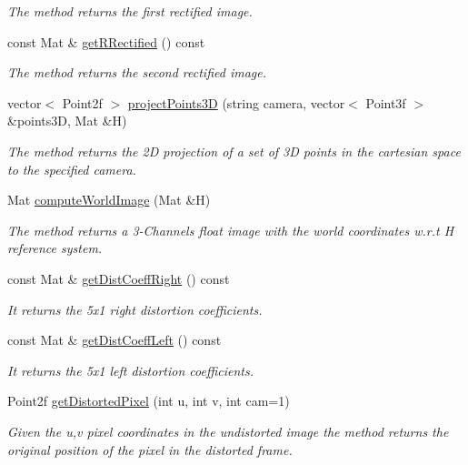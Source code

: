 \begin{DoxyCompactItemize}
\begin{DoxyCompactList}\small\item\em The method returns the first rectified image. \end{DoxyCompactList}\item 
const Mat \& \hyperlink{classStereoCamera_abe2388276233331d360a73d86080c981}{get\+R\+Rectified} () const 
\begin{DoxyCompactList}\small\item\em The method returns the second rectified image. \end{DoxyCompactList}\item 
vector$<$ Point2f $>$ \hyperlink{classStereoCamera_a03406c9d31c1b765a8d6ef9641222309}{project\+Points3D} (string camera, vector$<$ Point3f $>$ \&points3D, Mat \&H)
\begin{DoxyCompactList}\small\item\em The method returns the 2D projection of a set of 3D points in the cartesian space to the specified camera. \end{DoxyCompactList}\item 
Mat \hyperlink{classStereoCamera_a52ef2f3401488e5c4fa6badd1336f96d}{compute\+World\+Image} (Mat \&H)
\begin{DoxyCompactList}\small\item\em The method returns a 3-\/\+Channels float image with the world coordinates w.\+r.\+t H reference system. \end{DoxyCompactList}\item 
const Mat \& \hyperlink{classStereoCamera_a58f7ef25aa322cb40b2609758ff4768b}{get\+Dist\+Coeff\+Right} () const 
\begin{DoxyCompactList}\small\item\em It returns the 5x1 right distortion coefficients. \end{DoxyCompactList}\item 
const Mat \& \hyperlink{classStereoCamera_a3dbf51487738aabcb60595c53fb1660d}{get\+Dist\+Coeff\+Left} () const 
\begin{DoxyCompactList}\small\item\em It returns the 5x1 left distortion coefficients. \end{DoxyCompactList}\item 
Point2f \hyperlink{classStereoCamera_af64550bb8a7a665930dee5eea87b7e47}{get\+Distorted\+Pixel} (int u, int v, int cam=1)
\begin{DoxyCompactList}\small\item\em Given the u,v pixel coordinates in the undistorted image the method returns the original position of the pixel in the distorted frame. \end{DoxyCompactList}\item 

\end{DoxyCompactItemize}
